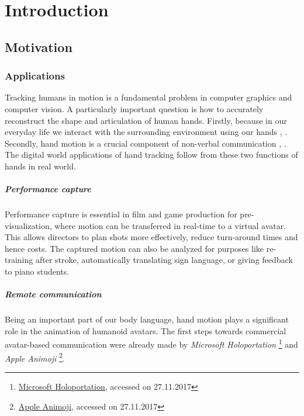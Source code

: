 \chapter{Introduction}

\section{Motivation}

\subsection*{Applications}

Tracking humans in motion is a fundamental problem in computer graphics and computer vision. A particularly important question is how to accurately reconstruct the shape and articulation of human hands. Firstly, because in our everyday life we interact with the surrounding environment using our hands \cite{bullock2013hand}, \cite{dollar2014classifying}. Secondly, hand motion is a crucial component of non-verbal communication \cite{goman2009nonverbal}, \cite{goman2011silent}. The digital world applications of hand tracking follow from these two functions of hands in real world.

\paragraph{Performance capture} Performance capture is essential in film and game production for pre-visualization, where motion can be transferred in real-time to a virtual avatar. This allows directors to plan shots more effectively, reduce turn-around times and hence costs. The captured motion can also be analyzed for purposes like re-training after stroke, automatically translating sign language, or giving feedback to piano students.

\paragraph{Remote communication} Being an important part of our body language, hand motion  plays a significant role in the animation of humanoid avatars. The first steps towards commercial avatar-based communication were already made by 
%
\textit{Microsoft Holoportation}
\footnote{\href{https://www.microsoft.com/en-us/research/project/holoportation-3/}{Microsoft Holoportation}, accessed on 27.11.2017}
%
and \textit{Apple Animoji} 
\footnote{\href{https://support.apple.com/en-us/HT208190}{Apple Animoji}, accessed on 27.11.2017}.

